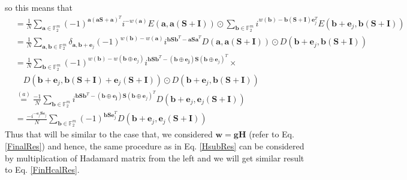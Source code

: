 \documentclass{article}
\begin{document}
\begin{enumerate}
	so this means that
	\begin{align}
		&=\frac{1}{N} \sum_{\mathbf{a}\in \mathbb{F}_2^m} (-1)^{\mathbf{a}(\mathbf{a}\mathbf{S} + \mathbf{a})^T} i^{-w(\mathbf{a})} E(\mathbf{a}, \mathbf{a}(\mathbf{S} + \mathbf{I})) \odot \sum_{\mathbf{b}\in \mathbb{F}_2^m} i^{w(\mathbf{b}) - \mathbf{b}(\mathbf{S} + \mathbf{I})\mathbf{e}_j^T} E(\mathbf{b} + \mathbf{e}_j, \mathbf{b}(\mathbf{S} + \mathbf{I})) \nonumber \\
		&=\frac{1}{N}\sum_{\mathbf{a},\mathbf{b}\in \mathbb{F}_2^m} \delta_{\mathbf{a}, \mathbf{b} + \mathbf{e}_j} (-1)^{w(\mathbf{b})-w(\mathbf{a})} i^{\mathbf{b S b}^T-\mathbf{a S a}^T} D(\mathbf{a}, \mathbf{a}(\mathbf{S}+\mathbf{I})) \odot D(\mathbf{b} + \mathbf{e}_j, \mathbf{b}(\mathbf{S}+\mathbf{I})) \nonumber \\
		&=\frac{1}{N}\sum_{\mathbf{b}\in \mathbb{F}_2^m}{(-1)^{w(\mathbf{b})-w(\mathbf{b}\oplus \mathbf{e}_j)} i^{\mathbf{b S b}^T-\mathbf{(\mathbf{b}\oplus \mathbf{e}_j) S }(\mathbf{b}\oplus \mathbf{e}_j)^T} } \times \nonumber\\
		&\quad D(\mathbf{b}+\mathbf{e}_j, \mathbf{b}(\mathbf{S}+\mathbf{I}) +\mathbf{e}_j (\mathbf{S}+\mathbf{I})) \odot D(\mathbf{b} + \mathbf{e}_j, \mathbf{b}(\mathbf{S}+\mathbf{I})) \nonumber \\
		&\stackrel{(a)}{=}\frac{-1}{N}\sum_{\mathbf{b}\in \mathbb{F}_2^m} i^{\mathbf{b S b}^T-\mathbf{(\mathbf{b}\oplus \mathbf{e}_j) S }(\mathbf{b}\oplus \mathbf{e}_j)^T} D(\mathbf{b} + \mathbf{e}_j, \mathbf{e}_j(\mathbf{S}+\mathbf{I}))   \nonumber \\
		&=\frac{-i^{-\mathbf{e}_j \mathbf{S e}_j}}{N}\sum_{\mathbf{b}\in \mathbb{F}_2^m} (-1)^{\mathbf{b Se}_j^T} D(\mathbf{b} + \mathbf{e}_j, \mathbf{e}_j(\mathbf{S}+\mathbf{I}))
	\end{align}
	Thus that will be similar to the case that, we considered $\mathbf{w=gH}$ (refer to Eq. \ref{FinalRes}) and hence, the same procedure as in Eq. \ref{HsubRes} can be considered by multiplication of Hadamard matrix from the left and we will get similar result to Eq. \ref{FinHcalRes}. 
	

\end{enumerate}
\end{document}
